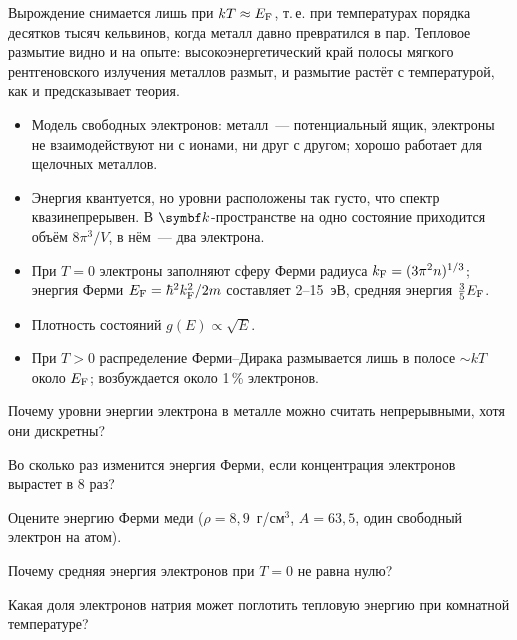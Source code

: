 Вырождение снимается лишь при $kT\approx E_{\mathrm{F}}$, т.\,е. при температурах
порядка десятков тысяч кельвинов, когда металл давно превратился в пар.
Тепловое размытие видно и на опыте: высокоэнергетический край полосы
мягкого рентгеновского излучения металлов размыт, и размытие растёт с
температурой, как и предсказывает теория.

\begin{itogi}
\begin{itemize}
\item Модель свободных электронов: металл~— потенциальный ящик, электроны
не взаимодействуют ни с ионами, ни друг с другом; хорошо работает для
щелочных металлов.
\item Энергия квантуется, но уровни расположены так густо, что спектр
квазинепрерывен. В $\vb k$-пространстве на одно состояние приходится
объём $8\pi^3/V$, в нём~— два электрона.
\item При $T=0$ электроны заполняют сферу Ферми радиуса
$k_{\mathrm{F}}=(3\pi^2n)^{1/3}$; энергия Ферми $E_{\mathrm{F}}=\hbar^2k_{\mathrm{F}}^2/2m$ составляет
2--15~эВ, средняя энергия $\frac35E_{\mathrm{F}}$.
\item Плотность состояний $g(E)\propto\sqrt E$.
\item При $T>0$ распределение Ферми--Дирака размывается лишь в полосе
$\sim kT$ около $E_{\mathrm{F}}$; возбуждается около 1\,\% электронов.
\end{itemize}
\end{itogi}

\begin{proverka}
\item Почему уровни энергии электрона в металле можно считать
непрерывными, хотя они дискретны?
\item Во сколько раз изменится энергия Ферми, если концентрация
электронов вырастет в 8 раз?
\item Оцените энергию Ферми меди ($\rho=8{,}9$~г/см$^3$, $A=63{,}5$, один
свободный электрон на атом).
\item Почему средняя энергия электронов при $T=0$ не равна нулю?
\item Какая доля электронов натрия может поглотить тепловую энергию при
комнатной температуре?
\end{proverka}
